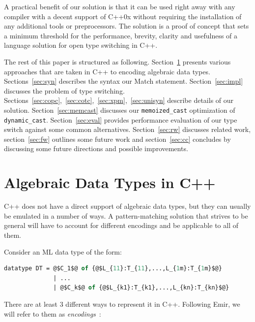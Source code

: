 \documentclass[preprint]{sigplanconf}
\makeatletter
\DeclareRobustCommand{\code}[1]{{\lstinline[breaklines=false,escapechar=@]{#1}}}
\makeatother
\begin{document}
A practical benefit of our solution is that it can be used right away with any 
compiler with a decent support of C++0x without requiring the installation of 
any additional tools or preprocessors. The solution is a proof of concept that 
sets a minimum threshold for the performance, brevity, clarity and usefulness of 
a language solution for open type switching in C++.

The rest of this paper is structured as following. Section~\ref{sec:adt} 
presents various approaches that are taken in C++ to encoding algebraic data 
types. Sections~\ref{sec:syn} describes the syntax our Match statement. 
Section~\ref{sec:impl} discusses the problem of type switching. 
Sections~\ref{sec:copc},~\ref{sec:cotc},~\ref{sec:xpm},~\ref{sec:unisyn} 
describe details of our solution. Section~\ref{sec:memcast} discusses our 
\code{memoized_cast} optimization of \code{dynamic_cast}. Section~\ref{sec:eval}
provides performance evaluation of our type switch against some common alternatives. 
Section~\ref{sec:rw} discusses related work, section~\ref{sec:fw} outlines some 
future work and section~\ref{sec:cc} concludes by discussing some future 
directions and possible improvements.


\section{Algebraic Data Types in C++}
\label{sec:adt}

C++ does not have a direct support of algebraic data types, but they can usually 
be emulated in a number of ways. A pattern-matching solution that strives to be 
general will have to account for different encodings and be applicable to all of 
them.

Consider an ML data type of the form:

\begin{lstlisting}[language=ML,keepspaces,columns=flexible,escapechar=@]
datatype DT = @$C_1$@ of {@$L_{11}:T_{11},...,L_{1m}:T_{1m}$@} 
              | ...
              | @$C_k$@ of {@$L_{k1}:T_{k1},...,L_{kn}:T_{kn}$@}
\end{lstlisting}

\noindent There are at least 3 different ways to represent it in C++. Following 
Emir, we will refer to them as \emph{encodings}~\cite{EmirThesis}:
\end{document}

